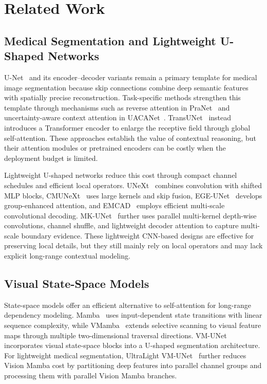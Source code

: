 \section{Related Work}

\subsection{Medical Segmentation and Lightweight U-Shaped Networks}

U-Net~\cite{ronneberger2015unet} and its encoder--decoder variants remain a primary template for medical image segmentation because skip connections combine deep semantic features with spatially precise reconstruction. Task-specific methods strengthen this template through mechanisms such as reverse attention in PraNet~\cite{fan2020pranet} and uncertainty-aware context attention in UACANet~\cite{kim2021uacanet}. TransUNet~\cite{chen2021transunet} instead introduces a Transformer encoder to enlarge the receptive field through global self-attention. These approaches establish the value of contextual reasoning, but their attention modules or pretrained encoders can be costly when the deployment budget is limited.

Lightweight U-shaped networks reduce this cost through compact channel schedules and efficient local operators. UNeXt~\cite{valanarasu2022unext} combines convolution with shifted MLP blocks, CMUNeXt~\cite{tang2024cmunext} uses large kernels and skip fusion, EGE-UNet~\cite{ruan2023egeunet} develops group-enhanced attention, and EMCAD~\cite{rahman2024emcad} employs efficient multi-scale convolutional decoding. MK-UNet~\cite{rahman2025mkunet} further uses parallel multi-kernel depth-wise convolutions, channel shuffle, and lightweight decoder attention to capture multi-scale boundary evidence. These lightweight CNN-based designs are effective for preserving local details, but they still mainly rely on local operators and may lack explicit long-range contextual modeling.

\subsection{Visual State-Space Models}

State-space models offer an efficient alternative to self-attention for long-range dependency modeling. Mamba~\cite{gu2023mamba} uses input-dependent state transitions with linear sequence complexity, while VMamba~\cite{liu2024vmamba} extends selective scanning to visual feature maps through multiple two-dimensional traversal directions. VM-UNet~\cite{ruan2024vmunet} incorporates visual state-space blocks into a U-shaped segmentation architecture. For lightweight medical segmentation, UltraLight VM-UNet~\cite{wu2024ultralight} further reduces Vision Mamba cost by partitioning deep features into parallel channel groups and processing them with parallel Vision Mamba branches.

